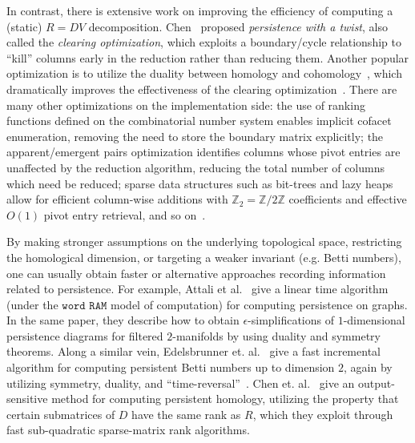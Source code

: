 \documentclass{siamart190516}
\begin{document}
In contrast, there is extensive work  on improving the efficiency of computing a (static) $R = DV$ decomposition. Chen~\cite{chen2011persistent} proposed \emph{persistence with a twist}, also called the \emph{clearing optimization}, which exploits a boundary/cycle relationship to ``kill'' columns early in the reduction rather than reducing them. 
Another popular optimization is to utilize the duality between   homology and cohomology~\cite{de2011dualities}, which dramatically improves the effectiveness of the clearing optimization~\cite{bauer2021ripser}. 
There are many other optimizations on the implementation side: the use of ranking functions defined on the combinatorial number system enables implicit cofacet enumeration, removing the need to store the boundary matrix explicitly; the apparent/emergent pairs optimization identifies columns whose pivot entries are unaffected by the reduction algorithm, reducing the total number of columns which need be reduced; sparse data structures such as bit-trees and lazy heaps allow for efficient column-wise additions with $\mathbb{Z}_2 = \mathbb{Z}/2\mathbb{Z}$ coefficients and effective $O(1)$ pivot entry retrieval, and so on~\cite{bauer2021ripser, bauer2017phat}. 

By making stronger assumptions on the underlying topological space, restricting the homological dimension, or targeting  a weaker invariant (e.g. Betti numbers), one can usually obtain  faster or alternative approaches  recording information related to persistence.
For example, Attali et al.~\cite{attali2009persistence} give a linear time algorithm (under the $\texttt{word RAM}$ model of computation) for computing persistence on graphs.
In the same paper, they describe how to obtain $\epsilon$-simplifications of $1$-dimensional persistence diagrams for filtered $2$-manifolds by using duality and symmetry theorems. 
Along a similar vein, Edelsbrunner et. al.~\cite{edelsbrunner2000topological} give a fast incremental algorithm for computing persistent Betti numbers up to dimension $2$, again by utilizing symmetry, duality, and ``time-reversal''~\cite{delfinado1995incremental}. Chen et. al.~\cite{chen2013output} give an output-sensitive method for computing persistent homology,  utilizing the property that certain submatrices of  $D$ have the same rank as  $R$, which they exploit through fast sub-quadratic sparse-matrix rank algorithms.  
\end{document}
